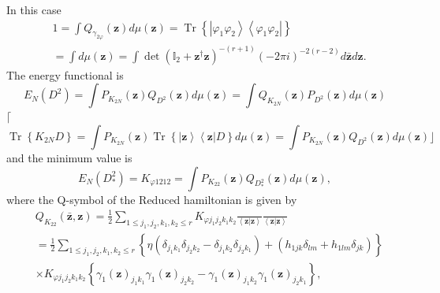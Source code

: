 \documentclass[aps,preprint]{revtex4}%
\begin{document}
In this case
\begin{align}
&  1=\int Q_{\gamma_{2\varphi}}\left(  \mathbf{z}\right)  d\mu\left(
\mathbf{z}\right)  =\operatorname*{Tr}\left\{  \left\vert \varphi_{1}%
\varphi_{2}\right\rangle \left\langle \varphi_{1}\varphi_{2}\right\vert
\right\}  \nonumber\\
&  =\int d\mu\left(  \mathbf{z}\right)  =\int\det\left(  \mathbb{I}%
_{2}+\mathbf{z}^{\dagger}\mathbf{z}\right)  ^{-\left(  r+1\right)  }\left(
-2\pi i\right)  ^{-2\left(  r-2\right)  }d\mathbf{\bar{z}}d\mathbf{z.}%
\end{align}
The energy functional is
\begin{equation}
E_{N}\left(  D^{2}\right)  =\int P_{K_{2N}}\left(  \mathbf{z}\right)
Q_{D^{2}}\left(  \mathbf{z}\right)  d\mu\left(  \mathbf{z}\right)  =\int
Q_{K_{2N}}\left(  \mathbf{z}\right)  P_{D^{2}}\left(  \mathbf{z}\right)
d\mu\left(  \mathbf{z}\right)
\end{equation}
$\lceil$%
\begin{equation}
\operatorname*{Tr}\left\{  K_{2N}D\right\}  =\int P_{K_{2N}}\left(
\mathbf{z}\right)  \operatorname*{Tr}\left\{  \left\vert \mathbf{z}%
\right\rangle \left\langle \mathbf{z}\right\vert D\right\}  d\mu\left(
\mathbf{z}\right)  =\int P_{K_{2N}}\left(  \mathbf{z}\right)  Q_{D^{2}}\left(
\mathbf{z}\right)  d\mu\left(  \mathbf{z}\right)  \rfloor
\end{equation}
and the minimum value is%
\begin{equation}
E_{N}\left(  D_{\ast}^{2}\right)  =K_{\varphi1212}=\int P_{K_{22}}\left(
\mathbf{z}\right)  Q_{D_{\ast}^{2}}\left(  \mathbf{z}\right)  d\mu\left(
\mathbf{z}\right)  ,
\end{equation}
where the Q-symbol of the Reduced hamiltonian is given by
\begin{align}
&  Q_{K_{22}}\left(  \mathbf{\bar{z}},\mathbf{z}\right)  =\frac{1}{2}%
\sum_{1\leq j_{1},j_{2},k_{1},k_{2}\leq r}K_{\varphi j_{1}j_{2}k_{1}k_{2}%
}\frac{{}}{\left\langle \mathbf{z}\left\vert \mathbf{z}\right.  \right\rangle
}\frac{{}}{\left\langle \mathbf{z}\left\vert \mathbf{z}\right.  \right\rangle
}\nonumber\\
&  =\frac{1}{2}\sum_{1\leq j_{1},j_{2},k_{1},k_{2}\leq r}\left\{  \eta\left(
\delta_{j_{1}k_{1}}\delta_{j_{2}k_{2}}-\delta_{j_{1}k_{2}}\delta_{j_{2}k_{1}%
}\right)  +\left(  h_{1jk}\delta_{lm}+h_{1lm}\delta_{jk}\right)  \right\}
\nonumber\\
&  \times K_{\varphi j_{1}j_{2}k_{1}k_{2}}\left\{  \gamma_{1}\left(
\mathbf{z}\right)  _{j_{1}k_{1}}\gamma_{1}\left(  \mathbf{z}\right)
_{j_{2}k_{2}}-\gamma_{1}\left(  \mathbf{z}\right)  _{j_{1}k_{2}}\gamma
_{1}\left(  \mathbf{z}\right)  _{j_{2}k_{1}}\right\}  ,
\end{align}
\end{document}
